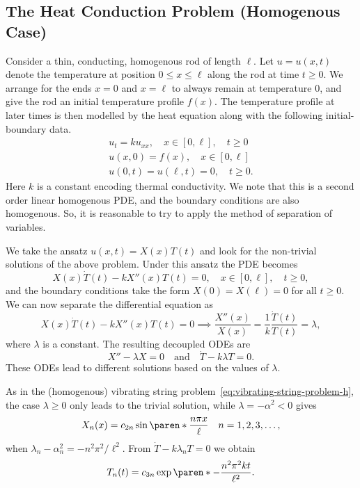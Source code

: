 \documentclass[11pt]{penrose}
\newcommand{\uxx}{u_{xx}}
\begin{document}
\subsection{The Heat Conduction Problem (Homogenous Case)}
Consider a thin, conducting, homogenous rod of length $\ell$. Let $u = u(x,t)$ denote the temperature at position $0 \leq x \leq \ell$ along the rod at time $t \geq 0$. We arrange for the ends $x=0$ and $x=\ell$ to always remain at temperature $0$, and give the rod an initial temperature profile $f(x)$. The temperature profile at later times is then modelled by the heat equation along with the following initial-boundary data.
\begin{equation}
\begin{gathered}
    u_t = k \uxx, \quad x \in [0, \ell], \quad t \geq 0\\
    u(x,0) = f(x), \quad x \in [0, \ell]\\
    u(0,t) = u(\ell,t) = 0, \quad t \geq 0.
\end{gathered}
\label{eq:heat-conduction-problem-h}
\end{equation}
Here $k$ is a constant encoding thermal conductivity. We note that this is a second order linear homogenous PDE, and the boundary conditions are also homogenous. So, it is reasonable to try to apply the method of separation of variables.

We take the ansatz $u(x,t) = X(x) T(t)$ and look for the non-trivial solutions of the above problem. Under this ansatz the PDE becomes
\begin{equation}
    X(x) \dot{T}(t) - k X''(x) T(t) = 0, \quad x \in [0, \ell], \quad t \geq 0,
\end{equation}
and the boundary conditions take the form $X(0) = X(\ell) = 0$ for all $t \geq 0$. We can now separate the differential equation as
\begin{equation}
    X(x) \dot{T}(t) - k X''(x) T(t) = 0
    \implies
    \frac{X''(x)}{X(x)} = \frac{1}{k} \frac{\dot{T}(t)}{T(t)} = \lambda,
\end{equation}
where $\lambda$ is a constant. The resulting decoupled ODEs are
\begin{equation}
    X'' - \lambda X = 0
    \quad\text{and}\quad
    \dot{T} - k \lambda T = 0.
\end{equation}
These ODEs lead to different solutions based on the values of $\lambda$.

As in the (homogenous) vibrating string problem~\eqref{eq:vibrating-string-problem-h}, the case $\lambda \geq 0$ only leads to the trivial solution, while $\lambda = - \alpha^2 < 0$ gives
\begin{equation}
    X_n (x) = c_{2n} \sin\paren*{\frac{n \pi x}{\ell}}
    \quad n = 1, 2, 3, \dots,
\end{equation}
when $\lambda_n -\alpha_n^2 = -n^2 \pi^2 / \ell^2$. From $\dot{T} - k \lambda_n T = 0$ we obtain
\begin{equation}
    T_n(t) = c_{3n} \exp\paren*{-\frac{n^2 \pi^2 kt}{\ell^2}}.
\end{equation}
\end{document}
